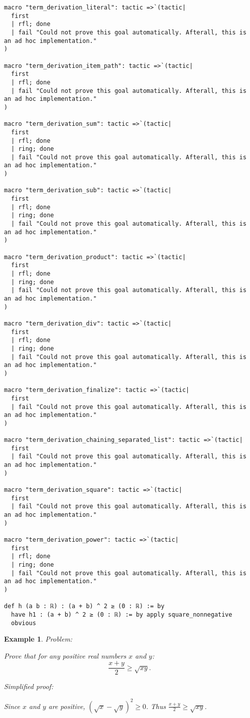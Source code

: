 \documentclass{article}
\newtheorem{example}{Example}
\begin{document}
\begin{tcolorbox}[colback=white!10, width=\linewidth]
\begin{lstlisting}[language=Lean4]
macro "term_derivation_literal": tactic =>`(tactic|
  first
  | rfl; done
  | fail "Could not prove this goal automatically. Afterall, this is an ad hoc implementation."
)

macro "term_derivation_item_path": tactic =>`(tactic|
  first
  | rfl; done
  | fail "Could not prove this goal automatically. Afterall, this is an ad hoc implementation."
)

macro "term_derivation_sum": tactic =>`(tactic|
  first
  | rfl; done
  | ring; done
  | fail "Could not prove this goal automatically. Afterall, this is an ad hoc implementation."
)

macro "term_derivation_sub": tactic =>`(tactic|
  first
  | rfl; done
  | ring; done
  | fail "Could not prove this goal automatically. Afterall, this is an ad hoc implementation."
)

macro "term_derivation_product": tactic =>`(tactic|
  first
  | rfl; done
  | ring; done
  | fail "Could not prove this goal automatically. Afterall, this is an ad hoc implementation."
)

macro "term_derivation_div": tactic =>`(tactic|
  first
  | rfl; done
  | ring; done
  | fail "Could not prove this goal automatically. Afterall, this is an ad hoc implementation."
)

macro "term_derivation_finalize": tactic =>`(tactic|
  first
  | fail "Could not prove this goal automatically. Afterall, this is an ad hoc implementation."
)

macro "term_derivation_chaining_separated_list": tactic =>`(tactic|
  first
  | fail "Could not prove this goal automatically. Afterall, this is an ad hoc implementation."
)

macro "term_derivation_square": tactic =>`(tactic|
  first
  | fail "Could not prove this goal automatically. Afterall, this is an ad hoc implementation."
)

macro "term_derivation_power": tactic =>`(tactic|
  first
  | rfl; done
  | ring; done
  | fail "Could not prove this goal automatically. Afterall, this is an ad hoc implementation."
)

def h (a b : ℝ) : (a + b) ^ 2 ≥ (0 : ℝ) := by
  have h1 : (a + b) ^ 2 ≥ (0 : ℝ) := by apply square_nonnegative
  obvious

\end{lstlisting}
\end{tcolorbox}


\begin{example}
Problem:
\begin{tcolorbox}[colback=yellow!10, width=\linewidth]
Prove that for any positive real numbers $x$ and $y$:
    $$\frac{x+y}{2} \geq \sqrt{xy}.$$
\end{tcolorbox}

Simplified proof:
\begin{tcolorbox}[colback=blue!10, width=\linewidth]
Since $x$ and $y$ are positive, $(\sqrt x - \sqrt y)^2 \ge 0$. Thus $\frac{x+y}{2} \ge \sqrt{xy}$.
\end{tcolorbox}
\end{example}
\end{document}
